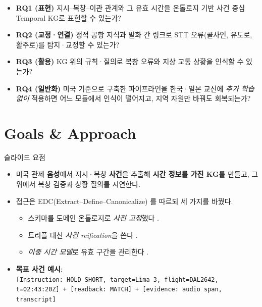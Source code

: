 \documentclass[10pt,a4paper]{article}
\begin{document}
\begin{itemize}
\item \textbf{RQ1 (표현)} 지시--복창--이관 관계와 그 유효 시간을 온톨로지 기반 사건 중심 Temporal KG로 표현할 수 있는가?
\item \textbf{RQ2 (교정·연결)} 정적 공항 지식과 발화 간 링크로 STT 오류(콜사인, 유도로, 활주로)를 탐지·교정할 수 있는가?
\item \textbf{RQ3 (활용)} KG 위의 규칙·질의로 복창 오류와 지상 교통 상황을 인식할 수 있는가?
\item \textbf{RQ4 (일반화)} 미국 기준으로 구축한 파이프라인을 한국·일본 교신에 \emph{추가 학습 없이} 적용하면 어느 모듈에서 인식이 떨어지고, 지역 자원만 바꿔도 회복되는가?
\end{itemize}

\section{Goals \& Approach}
\begin{keybox}{슬라이드 요점}
\begin{itemize}[leftmargin=12pt]
\item 미국 관제 \textbf{음성}에서 지시·복창 \textbf{사건}을 추출해 \textbf{시간 정보를 가진 KG}를 만들고, 그 위에서 복창 검증과 상황 질의를 시연한다.
\item 접근은 EDC(Extract--Define--Canonicalize) \cite{edc2024}를 따르되 세 가지를 바꿨다.
  \begin{itemize}
  \item 스키마를 도메인 온톨로지로 \emph{사전 고정}했다 \cite{helmke2018,feng2024}.
  \item 트리플 대신 \emph{사건 reification}을 쓴다 \cite{naryw3c}.
  \item \emph{이중 시간 모델}로 유효 구간을 관리한다 \cite{zep2025}.
  \end{itemize}
\item \textbf{목표 사건 예시}:\\
\texttt{[Instruction: HOLD\_SHORT, target=Lima 3, flight=DAL2642, t=02:43:20Z] + [readback: MATCH] + [evidence: audio span, transcript]}
\end{itemize}
\end{keybox}
\end{document}
